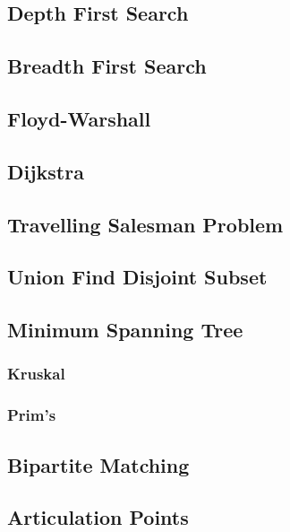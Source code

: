 \documentclass{article}
\begin{document}
\subsection{Depth First Search}

\subsection{Breadth First Search}

\subsection{Floyd-Warshall}

\subsection{Dijkstra}

\subsection{Travelling Salesman Problem}

\subsection{Union Find Disjoint Subset}


\subsection{Minimum Spanning Tree}
\subsubsection{Kruskal}

\subsubsection{Prim's}


\subsection{Bipartite Matching}

\subsection{Articulation Points}

\end{document}
